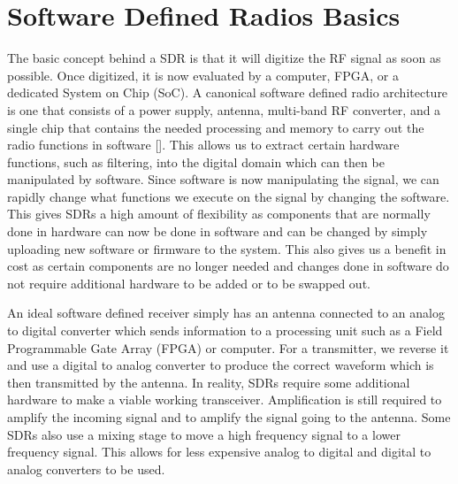  
\section{Software Defined Radios Basics} 
The basic concept behind a SDR is that it will digitize the RF signal as soon as possible.  Once digitized, it is now evaluated by a computer, FPGA, or a dedicated System on Chip (SoC).  A canonical software defined radio architecture is one that consists of a power supply, antenna, multi-band RF converter, and a single chip that contains the needed processing and memory to carry out the radio functions in software [\cite{Mitola1995}]. This allows us to extract certain hardware functions, such as filtering, into the digital domain which can then be manipulated by software.  Since software is now manipulating the signal, we can rapidly change what functions we execute on the signal by changing the software.  This gives SDRs a high amount of flexibility as components that are normally done in hardware can now be done in software and can be changed by simply uploading new software or firmware to the system.  This also gives us a benefit in cost as certain components are no longer needed and changes done in software do not require additional hardware to be added or to be swapped out.

An ideal software defined receiver simply has an antenna connected to an analog to digital converter which sends information to a processing unit such as a Field Programmable Gate Array (FPGA) or computer.  For a transmitter, we reverse it and use a digital to analog converter to produce the correct waveform which is then transmitted by the antenna.  In reality, SDRs require some additional hardware to make a viable working transceiver.  Amplification is still required to amplify the incoming signal and to amplify the signal going to the antenna.  Some SDRs also use a mixing stage to move a high frequency signal to a lower frequency signal.  This allows for less expensive analog to digital and digital to analog converters to be used.  

